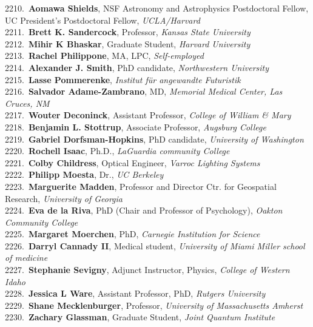 2210.~{\bf Aomawa Shields}, NSF Astronomy and Astrophysics Postdoctoral Fellow, UC President's Postdoctoral Fellow, {\sl UCLA/Harvard} \\
2211.~{\bf Brett K. Sandercock}, Professor, {\sl Kansas State University} \\
2212.~{\bf Mihir K Bhaskar}, Graduate Student, {\sl Harvard University} \\
2213.~{\bf Rachel Philippone}, MA, LPC, {\sl Self-employed} \\
2214.~{\bf Alexander J. Smith}, PhD candidate, {\sl Northwestern University} \\
2215.~{\bf Lasse Pommerenke}, {\sl Institut für angewandte Futuristik} \\
2216.~{\bf Salvador Adame-Zambrano}, MD, {\sl Memorial Medical Center, Las Cruces, NM} \\
2217.~{\bf Wouter Deconinck}, Assistant Professor, {\sl College of William \& Mary} \\
2218.~{\bf Benjamin L. Stottrup}, Associate Professor, {\sl Augsburg College} \\
2219.~{\bf Gabriel Dorfsman-Hopkins}, PhD candidate, {\sl University of Washington} \\
2220.~{\bf Rochell Isaac}, Ph.D., {\sl LaGuardia community College} \\
2221.~{\bf Colby Childress}, Optical Engineer, {\sl Varroc Lighting Systems} \\
2222.~{\bf Philipp Moesta}, Dr., {\sl UC Berkeley} \\
2223.~{\bf Marguerite Madden},  Professor and Director Ctr. for Geospatial Research, {\sl University of Georgia} \\
2224.~{\bf Eva de la Riva}, PhD (Chair and Professor of Psychology), {\sl Oakton Community College} \\
2225.~{\bf Margaret Moerchen}, PhD, {\sl Carnegie Institution for Science} \\
2226.~{\bf Darryl Cannady II}, Medical student, {\sl University of Miami Miller school of medicine } \\
2227.~{\bf Stephanie Sevigny}, Adjunct Instructor, Physics, {\sl College of Western Idaho} \\
2228.~{\bf Jessica L Ware}, Assistant Professor, PhD, {\sl Rutgers University} \\
2229.~{\bf Shane Mecklenburger}, Professor, {\sl University of Massachusetts Amherst} \\
2230.~{\bf Zachary Glassman}, Graduate Student, {\sl Joint Quantum Institute} \\
